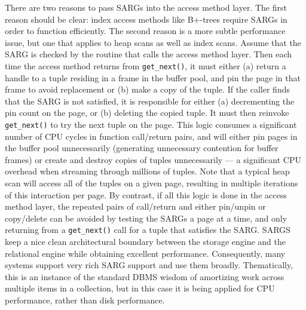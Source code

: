 \documentclass[b5paper,11pt,twoside,openright]{book}
\begin{document}
There are two reasons to pass SARGs into the access method layer. The
first reason should be clear: index access methods like B+-trees require
SARGs in order to function efficiently. The second reason is a more
subtle performance issue, but one that applies to heap scans as well as
index scans. Assume that the SARG is checked by the routine that calls
the access method layer. Then each time the access method returns from
\texttt{get\_next()}, it must either (a) return a handle to a tuple residing in a
frame in the buffer pool, and pin the page in that frame to avoid
replacement or (b) make a copy of the tuple. If the caller finds that
the SARG is not satisfied, it is responsible for either (a) decrementing
the pin count on the page, or (b) deleting the copied tuple. It must
then reinvoke \texttt{get\_next()} to try the next tuple on the page. This logic
consumes a significant number of CPU cycles in function call/return
pairs, and will either pin pages in the buffer pool unnecessarily
(generating unnecessary contention for buffer frames) or create and
destroy copies of tuples unnecessarily --- a significant CPU overhead
when streaming through millions of tuples. Note that a typical heap scan
will access all of the tuples on a given page, resulting in multiple
iterations of this interaction per page. By contrast, if all this logic
is done in the access method layer, the repeated pairs of call/return
and either pin/unpin or copy/delete can be avoided by testing the SARGs
a page at a time, and only returning from a \texttt{get\_next()} call for a tuple
that satisfies the SARG. SARGS keep a nice clean architectural boundary
between the storage engine and the relational engine while obtaining
excellent performance. Consequently, many systems support very rich SARG
support and use them broadly. Thematically, this is an instance of the
standard DBMS wisdom of amortizing work across multiple items in a
collection, but in this case it is being applied for CPU performance,
rather than disk performance.
\end{document}
